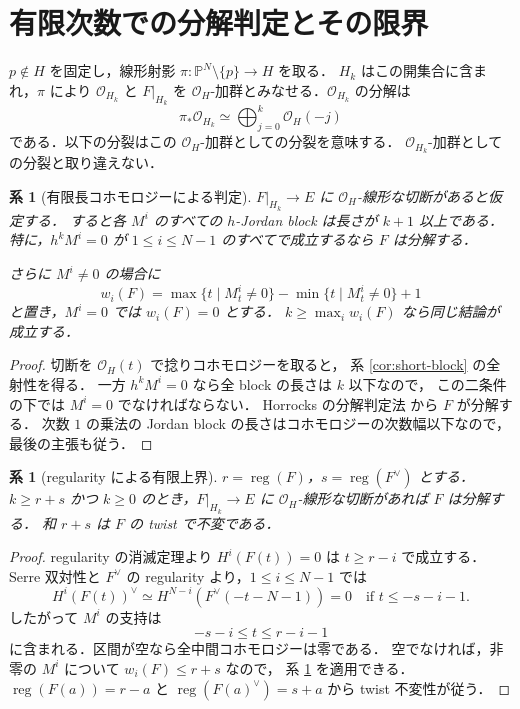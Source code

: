 \documentclass[a4paper,11pt]{ltjsarticle}
\numberwithin{equation}{section}
\theoremstyle{plain}
\newtheorem{corollary}[theorem]{系}
\theoremstyle{definition}
\theoremstyle{remark}
\begin{document}
\section{有限次数での分解判定とその限界}

$p\notin H$ を固定し，線形射影
$\pi:\mathbb P^N\setminus\{p\}\to H$ を取る．
$H_k$ はこの開集合に含まれ，$\pi$ により $\mathcal O_{H_k}$ と $F|_{H_k}$ を
$\mathcal O_H$-加群とみなせる．$\mathcal O_{H_k}$ の分解は
\[
 \pi_*\mathcal O_{H_k}\simeq\bigoplus_{j=0}^k\mathcal O_H(-j)
\]
である．以下の分裂はこの $\mathcal O_H$-加群としての分裂を意味する．
$\mathcal O_{H_k}$-加群としての分裂と取り違えない．

\begin{corollary}[有限長コホモロジーによる判定]\label{cor:finite-split}
$F|_{H_k}\to E$ に $\mathcal O_H$-線形な切断があると仮定する．
すると各 $M^i$ のすべての $h$-Jordan block は長さが $k+1$ 以上である．
特に，$h^kM^i=0$ が $1\leq i\leq N-1$ のすべてで成立するなら $F$ は分解する．

さらに $M^i\neq0$ の場合に
\[
 w_i(F)=\max\{t\mid M^i_t\neq0\}-\min\{t\mid M^i_t\neq0\}+1
\]
と置き，$M^i=0$ では $w_i(F)=0$ とする．
$k\geq\max_i w_i(F)$ なら同じ結論が成立する．
\end{corollary}

\begin{proof}
切断を $\mathcal O_H(t)$ で捻りコホモロジーを取ると，
系 \ref{cor:short-block} の全射性を得る．
一方 $h^kM^i=0$ なら全 block の長さは $k$ 以下なので，
この二条件の下では $M^i=0$ でなければならない．
Horrocks の分解判定法 \cite{Horrocks1964} から $F$ が分解する．
次数 $1$ の乗法の Jordan block の長さはコホモロジーの次数幅以下なので，最後の主張も従う．
\end{proof}

\begin{corollary}[regularity による有限上界]\label{cor:regularity-jet}
$r=\operatorname{reg}(F)$，$s=\operatorname{reg}(F^\vee)$ とする．
$k\geq r+s$ かつ $k\geq0$ のとき，$F|_{H_k}\to E$ に
$\mathcal O_H$-線形な切断があれば $F$ は分解する．
和 $r+s$ は $F$ の twist で不変である．
\end{corollary}

\begin{proof}
regularity の消滅定理より $H^i(F(t))=0$ は $t\geq r-i$ で成立する．
Serre 双対性と $F^\vee$ の regularity より，$1\leq i\leq N-1$ では
\[
 H^i(F(t))^\vee\simeq H^{N-i}(F^\vee(-t-N-1))=0
 \quad\text{if }t\leq-s-i-1.
\]
したがって $M^i$ の支持は
\[
 -s-i\leq t\leq r-i-1
\]
に含まれる．区間が空なら全中間コホモロジーは零である．
空でなければ，非零の $M^i$ について $w_i(F)\leq r+s$ なので，
系 \ref{cor:finite-split} を適用できる．
$\operatorname{reg}(F(a))=r-a$ と
$\operatorname{reg}(F(a)^\vee)=s+a$ から twist 不変性が従う．
\end{proof}
\end{document}
